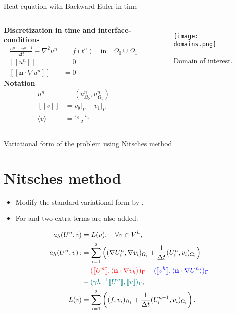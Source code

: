 \documentclass[mathserif]{beamer}
\begin{document}
\begin{frame}{Heat-equation with Backward Euler in time}
  \begin{columns}
    \textbf{Discretization in time and interface-conditions}
    \begin{align*}
      \frac{u^n-u^{n-1}}{\Delta t} - \nabla^2 u^n&= f(t^n)
      \quad \text{in}\quad \Omega_0\cup\Omega_1\\
            [\![u^n]\!]&=0\\
            [\![\mathbf n \cdot \nabla u^n]\!]&=0
    \end{align*}
    \textbf{Notation}
    \begin{align*}
      u^n&=(u^n_{\Omega_0},u^n_{\Omega_1})\\
      [\![v]\!]&=v_0\vert_\Gamma-v_1\vert_\Gamma\\
      \langle v \rangle &= \frac{v_0+v_1}{2} 
    \end{align*}

    \begin{figure}
      \centering
      \texttt{[image: domains.png]}
      \caption{Domain of interest.}
    \end{figure}
  \end{columns}
\end{frame}

\begin{frame}{Variational form of the problem using Nitsches method
    \section{Nitsches method}}
  \begin{itemize}
  \item Modify the standard variational form by .\\
  \item For  and
     two extra terms are also added.
  \end{itemize}
  \begin{align*}
  a_h(U^n,v)&=L(v), \quad \forall v\in V^h,\\
  a_h(U^n,v):&=\sum_{i=1}^2\Big( (\nabla U_i^n, \nabla v_i)_{\Omega_i}+
  \frac{1}{\Delta t}(U_i^n, v_i)_{\Omega_i}\Big)\\
  &- \mathbin{\textcolor{red}{([\![U^n]\!], \langle\mathbf{n}\cdot\nabla v_h\rangle)_\Gamma}}
  - \mathbin{\textcolor{blue}{([\![ v^h]\!], \langle\mathbf{n}\cdot\nabla U^n\rangle)_\Gamma}}\\
  &+\mathbin{\textcolor{teal}{ (\gamma h^{-1} [\![U^n]\!], [\![v]\!])_\Gamma\nonumber}},\\
  L(v)&=\sum_{i=1}^2\left((f,v_i)_{\Omega_i}+\frac{1}{\Delta t}(U_i^{n-1},v_i)_{\Omega_i} \right).
\end{align*}
\end{frame}
\end{document}
